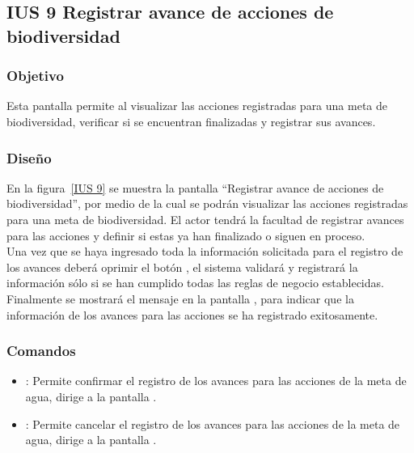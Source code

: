 \subsection{IUS 9 Registrar avance de acciones de biodiversidad}

\subsubsection{Objetivo}

Esta pantalla permite al  visualizar las acciones registradas para una meta de biodiversidad, verificar si se encuentran finalizadas y registrar sus avances. 
    
\subsubsection{Diseño}

    En la figura~\ref{IUS 9} se muestra la pantalla ``Registrar avance de acciones de biodiversidad'', por medio de la cual se podrán visualizar las acciones registradas para una meta de biodiversidad. El actor tendrá la facultad de registrar avances para las acciones y definir si estas ya han finalizado o siguen en proceso.\\
        
    Una vez que se haya ingresado toda la información solicitada para el registro de los avances deberá oprimir el botón , el sistema validará y registrará la información sólo si se han cumplido todas las reglas de negocio establecidas.\\
    
    Finalmente se mostrará el mensaje  en la pantalla , para indicar que la información de los avances para las acciones se ha registrado exitosamente.
        


\subsubsection{Comandos}
    \begin{itemize} 
    \item {}: Permite confirmar el registro de los avances para las acciones de la meta de agua, dirige a la pantalla .
    \item {}: Permite cancelar el registro de los avances para las acciones de la meta de agua, dirige a la pantalla .
    \end{itemize}

